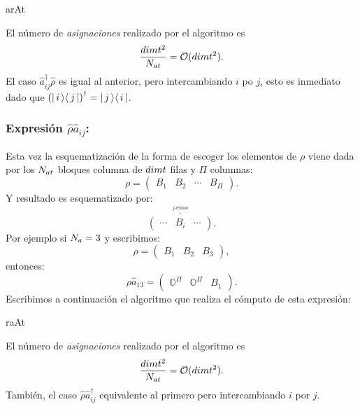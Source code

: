 \begin{algorithm}[H]
\caption{arAt}\label{algo:arAt}
\LinesNumbered
{}
\end{algorithm}
\quad El n\'umero de \emph{asignaciones} realizado por el algoritmo es $$\frac{dimt^2}{N_{at}}=\mathcal{O}(dimt^2).$$ El caso $\hat{a}_{ij}^{\dag}\hat{\rho}$ es igual al anterior, pero intercambiando $i$ po $j$, esto es inmediato dado que $\left(\vert\, i \,\rangle\langle\, j \,\vert\right)^{\dag}=\vert\, j \,\rangle\langle\, i \,\vert$.
\subsubsection*{Expresi\'on $\hat{\rho}\hat{a}_{ij}$: } Esta vez la esquematizaci\'on de la forma de escoger los elementos de $\rho$ viene dada por los $N_{at}$ bloques columna de $dimt$ filas y $\Pi$ columnas:\begin{equation}
\rho=\left(\begin{array}{cccc}              
B_{1}&B_2&\cdots&B_{\Pi}
             \end{array}\right).\label{ec:esquema_rhoaij}
\end{equation}
Y resultado es esquematizado por:
$$\overset{ \overbrace{}^{\mbox{$j$-\'esimo}}}{\left(\begin{array}{ccc}
\cdots&B_{i}&\cdots
        \end{array}\right)}.
$$
Por ejemplo si $N_a=3$ y escribimos:
$$\rho=\left(\begin{array}{ccc}              
B_{1}&B_2&B_3
             \end{array}\right),
$$
entonces:
$$\rho\hat{a}_{13}=\left(\begin{array}{ccc}              
\mathbb{O}^\Pi&\mathbb{O}^\Pi&B_{1}
             \end{array}\right).
$$
\quad Escribimos a continuaci\'on el algoritmo que realiza el c\'omputo de esta expresi\'on:

\begin{algorithm}[H]
\caption{raAt}\label{algo:raAt}
\LinesNumbered
{}
\end{algorithm}
\quad El n\'umero de \emph{asignaciones} realizado por el algoritmo es $$\frac{dimt^2}{N_{at}}=\mathcal{O}(dimt^2).$$ Tambi\'en, el caso $\hat{\rho}\hat{a}_{ij}^{\dag}$ equivalente al primero pero intercambiando $i$ por $j$.
